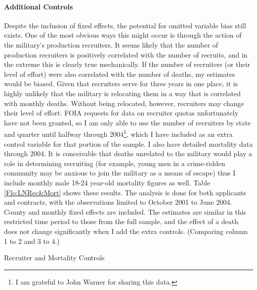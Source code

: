 \documentclass[12pt] {article}
\begin{document}
\paragraph{Additional Controls}

Despite the inclusion of fixed effects, the potential for omitted
variable bias still exists. One of the most obvious ways this might
occur is through the action of the military's production recruiters.
It seems likely that the number of production recruiters is positively
correlated with the number of recruits, and in the extreme this is
clearly true mechanically. If the number of recruiters (or their level
of effort) were also correlated with the number of deaths, my estimates
would be biased. Given that recruiters serve for three years in one
place, it is highly unlikely that the military is relocating them
in a way that is correlated with monthly deaths. Without being relocated,
however, recruiters may change their level of effort. FOIA requests for data on recruiter quotas unfortunately have not been granted, so I am only able to use the number of recruiters by state and quarter until halfway through 2004\footnote{I am grateful to John Warner for sharing this data.}, which I have included as an extra control variable for that portion of the sample. I also have detailed mortality data through 2004. It is conceivable that deaths unrelated to
the military would play a role in determining recruiting (for example,
young men in a crime-ridden community may be anxious to join the military
as a means of escape) thus I include monthly male 18-24 year-old mortality figures
as well. Table \ref{Flo:LNRec&Mort} shows these results. The
analysis is done for both applicants and contracts, with the observations
limited to October 2001 to June 2004. County and monthly
fixed effects are included. The estimates are similar in this restricted time period to those from the full sample, and the effect of a death does not change significantly when I add the extra controls. (Comparing column 1 to 2 and 3 to 4.)  %

\begin{table}
\caption{Recruiter and Mortality Controls}
\label{Flo:LNRec&Mort}
\end{table}
\end{document}
